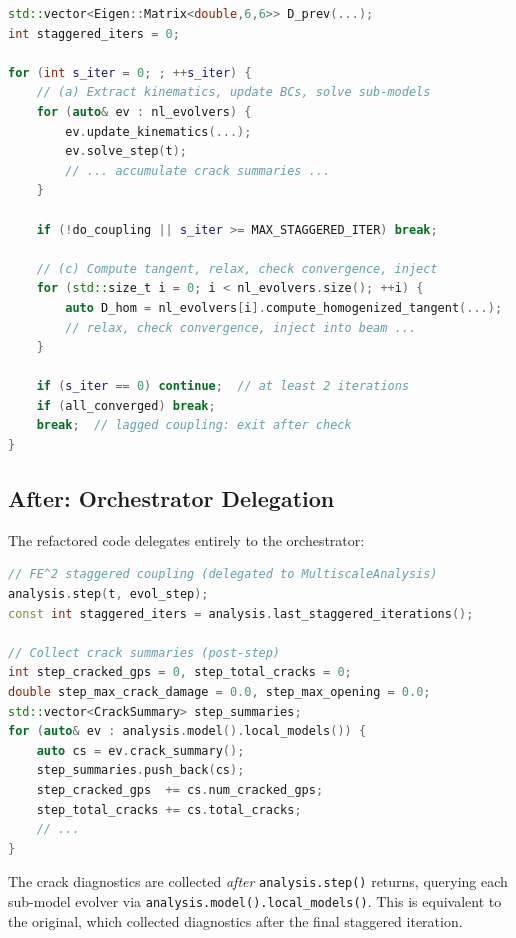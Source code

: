 \begin{lstlisting}[language=C++,caption={Original staggered coupling
  loop (abbreviated, $\sim$80 lines).},label={lst:driver-before}]
std::vector<Eigen::Matrix<double,6,6>> D_prev(...);
int staggered_iters = 0;

for (int s_iter = 0; ; ++s_iter) {
    // (a) Extract kinematics, update BCs, solve sub-models
    for (auto& ev : nl_evolvers) {
        ev.update_kinematics(...);
        ev.solve_step(t);
        // ... accumulate crack summaries ...
    }

    if (!do_coupling || s_iter >= MAX_STAGGERED_ITER) break;

    // (c) Compute tangent, relax, check convergence, inject
    for (std::size_t i = 0; i < nl_evolvers.size(); ++i) {
        auto D_hom = nl_evolvers[i].compute_homogenized_tangent(...);
        // relax, check convergence, inject into beam ...
    }

    if (s_iter == 0) continue;  // at least 2 iterations
    if (all_converged) break;
    break;  // lagged coupling: exit after check
}
\end{lstlisting}

\subsection{After: Orchestrator Delegation}

The refactored code delegates entirely to the orchestrator:

\begin{lstlisting}[language=C++,caption={Refactored staggered coupling
  ($\sim$15 lines).},label={lst:driver-after}]
// FE^2 staggered coupling (delegated to MultiscaleAnalysis)
analysis.step(t, evol_step);
const int staggered_iters = analysis.last_staggered_iterations();

// Collect crack summaries (post-step)
int step_cracked_gps = 0, step_total_cracks = 0;
double step_max_crack_damage = 0.0, step_max_opening = 0.0;
std::vector<CrackSummary> step_summaries;
for (auto& ev : analysis.model().local_models()) {
    auto cs = ev.crack_summary();
    step_summaries.push_back(cs);
    step_cracked_gps  += cs.num_cracked_gps;
    step_total_cracks += cs.total_cracks;
    // ...
}
\end{lstlisting}

The crack diagnostics are collected \emph{after}
\verb|analysis.step()| returns, querying each sub-model evolver via
\verb|analysis.model().local_models()|.  This is equivalent to the
original, which collected diagnostics after the final staggered
iteration.


